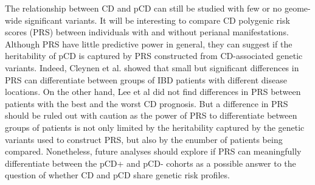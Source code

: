 The relationship between CD and pCD can still be studied with few or no geome-wide significant variants. It will be interesting to compare CD polygenic risk scores (PRS) between individuals with and without perianal manifestations. Although PRS have little predictive power in general, they can suggest if the heritability of pCD is captured by PRS constructed from CD-associated genetic variants. Indeed, Cleynen et al. \cite{Cleynen2016-ha} showed that small but significant differences in PRS can differentiate between groups of IBD patients with different disease locations. On the other hand, Lee et al \cite{Lee2017-tl} did not find differences in PRS between patients with the best and the worst CD prognosis. But a difference in PRS should be ruled out with caution as the power of PRS to differentiate between groups of patients is not only limited by the heritability captured by the genetic variants used to construct PRS, but also by the enumber of patients being compared. Nonetheless, future analyses should explore if PRS can meaningfully differentiate between the pCD+ and pCD- cohorts as a possible answer to the question of whether CD and pCD share genetic risk profiles.





